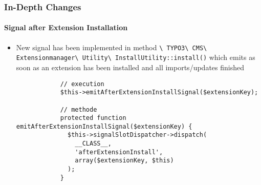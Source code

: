 \begin{frame}[fragile]
	\frametitle{In-Depth Changes}
	\framesubtitle{Signal after Extension Installation}

	\lstset{basicstyle=\tiny\ttfamily}

	\begin{itemize}

		\item New signal has been implemented in method
			\smaller
				\texttt{\textbackslash
					TYPO3\textbackslash
					CMS\textbackslash
					Extensionmanager\textbackslash
					Utility\textbackslash
					InstallUtility::install()}
			\normalsize
			which emits as soon as an extension has been installed and all imports/updates
			finished

		\begin{lstlisting}
			// execution
			$this->emitAfterExtensionInstallSignal($extensionKey);

			// methode
			protected function emitAfterExtensionInstallSignal($extensionKey) {
			  $this->signalSlotDispatcher->dispatch(
			    __CLASS__,
			    'afterExtensionInstall',
			    array($extensionKey, $this)
			  );
			}
		\end{lstlisting}

	\end{itemize}

\end{frame}


